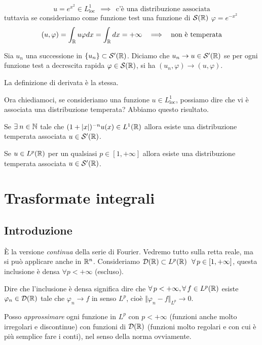 \begin{equation*}
u = e^{x^{2}} \in L^{1}_{\mathrm{loc}} \ \ \implies \ \ \text{c'è una distribuzione associata}
\end{equation*}
tuttavia se consideriamo come funzione test una funzione di $\mathcal{S}(\mathbb{R})$ $\varphi = e^{- x^{2}}$
\begin{equation*}
(u, \varphi) = \int_{\mathbb{R}} u\varphi dx = \int_{\mathbb{R}} dx = + \infty \ \ \implies \ \ \text{non è temperata}
\end{equation*}
\begin{defn}
Sia $u_{n}$ una successione in $\{u_{n}\} \subset \mathcal{S}'(\mathbb{R})$. Diciamo che $u_{n}\rightarrow u\in \mathcal{S}'(\mathbb{R})$ se per ogni funzione test a decrescita rapida $\varphi \in \mathcal{S}(\mathbb{R})$, si ha $(u_{n}, \varphi)\rightarrow (u, \varphi)$.
\end{defn}
La definizione di derivata è la stessa.

Ora chiediamoci, se consideriamo una funzione $u\in L^{1}_{\mathrm{loc}}$, possiamo dire che vi è associata una distribuzione temperata? Abbiamo questo risultato.
\begin{thm}
Se $\exists n\in \NN$ tale che $(1 + | x|)^{- n} u(x) \in L^{1}(\mathbb{R})$ allora esiste una distribuzione temperata associata $u\in \mathcal{S}'(\mathbb{R})$.
\end{thm}
\begin{thm}
Se $u\in L^{p}(\mathbb{R})$ per un qualsiasi $p\in [1, + \infty]$ allora esiste una distribuzione temperata associata $u\in \mathcal{S}'(\mathbb{R})$.
\end{thm}

\chapter{Trasformate integrali}

\section{Introduzione}

È la versione \textit{continua} della serie di Fourier. Vedremo tutto sulla retta reale, ma si può applicare anche in $\mathbb{R}^{n}$. Consideriamo $\Dc(\RR) \subset L^{p}(\RR) \ \ \forall p\in [1, + \infty]$, questa inclusione è densa $\forall p < + \infty $ (escluso).
\begin{defn}
Dire che l'inclusione è densa significa dire che $\forall p < + \infty, \forall f\in L^{p}(\RR)$ esiste $\varphi_{n} \in \mathcal{D}(\mathbb{R})$ tale che $\varphi_{n}\rightarrow f$ in senso $L^{p}$, cioè $ \Vert \varphi_{n} - f \Vert_{L^{p}}\rightarrow 0$.
\end{defn}
Posso \textit{approssimare} ogni funzione in $L^{p}$ con $p < + \infty $ (funzioni anche molto irregolari e discontinue) con funzioni di $\mathcal{D}(\mathbb{R})$ (funzioni molto regolari e con cui è più semplice fare i conti), nel senso della norma ovviamente.

